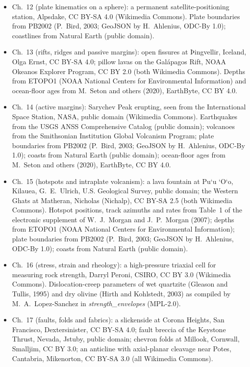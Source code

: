 \begin{itemize}
  \item Ch.~12 (plate kinematics on a sphere): a permanent satellite-positioning station, Alpsdake, CC BY-SA 4.0 (Wikimedia Commons). Plate boundaries from PB2002 (P.~Bird, 2003; GeoJSON by H.~Ahlenius, ODC-By 1.0); coastlines from Natural Earth (public domain).
  \item Ch.~13 (rifts, ridges and passive margins): open fissures at Þingvellir, Iceland, Olga Ernst, CC BY-SA 4.0; pillow lavas on the Galápagos Rift, NOAA Okeanos Explorer Program, CC BY 2.0 (both Wikimedia Commons). Depths from ETOPO1 (NOAA National Centers for Environmental Information) and ocean-floor ages from M.~Seton and others (2020), EarthByte, CC BY 4.0.
  \item Ch.~14 (active margins): Sarychev Peak erupting, seen from the International Space Station, NASA, public domain (Wikimedia Commons). Earthquakes from the USGS ANSS Comprehensive Catalog (public domain); volcanoes from the Smithsonian Institution Global Volcanism Program; plate boundaries from PB2002 (P.~Bird, 2003; GeoJSON by H.~Ahlenius, ODC-By 1.0); coasts from Natural Earth (public domain); ocean-floor ages from M.~Seton and others (2020), EarthByte, CC BY 4.0.
  \item Ch.~15 (hotspots and intraplate volcanism): a lava fountain at Pu\textquoteleft u \textquoteleft O\textquoteleft o, Kilauea, G.~E.~Ulrich, U.S. Geological Survey, public domain; the Western Ghats at Matheran, Nicholas (Nichalp), CC BY-SA 2.5 (both Wikimedia Commons). Hotspot positions, track azimuths and rates from Table~1 of the electronic supplement of W.~J.~Morgan and J.~P.~Morgan (2007); depths from ETOPO1 (NOAA National Centers for Environmental Information); plate boundaries from PB2002 (P.~Bird, 2003; GeoJSON by H.~Ahlenius, ODC-By 1.0); coasts from Natural Earth (public domain).
  \item Ch.~16 (stress, strain and rheology): a high-pressure triaxial cell for measuring rock strength, Darryl Peroni, CSIRO, CC BY 3.0 (Wikimedia Commons). Dislocation-creep parameters of wet quartzite (Gleason and Tullis, 1995) and dry olivine (Hirth and Kohlstedt, 2003) as compiled by M.~A.~Lopez-Sanchez in \emph{strength\_envelopes} (MPL-2.0).
  \item Ch.~17 (faults, folds and fabrics): a slickenside at Corona Heights, San Francisco, Dextersinister, CC BY-SA 4.0; fault breccia of the Keystone Thrust, Nevada, Jstuby, public domain; chevron folds at Millook, Cornwall, Smalljim, CC BY 3.0; an anticline with axial-planar cleavage near Potes, Cantabria, Mikenorton, CC BY-SA 3.0 (all Wikimedia Commons).

\end{itemize}
